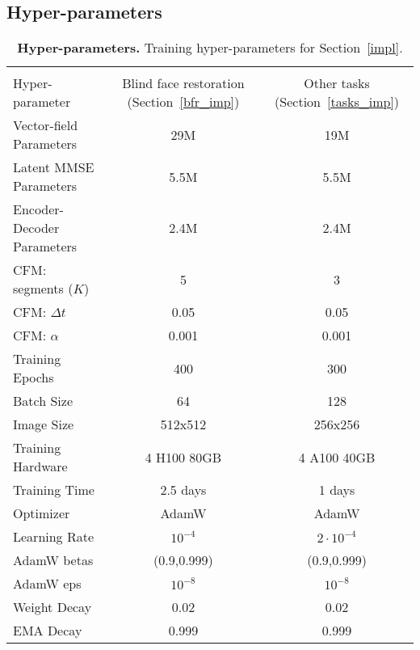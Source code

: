 \subsection{Hyper-parameters}\label{apx:hp}
\begin{table}[H]
\centering
\caption{\textbf{Hyper-parameters.} Training hyper-parameters
for Section~\ref{impl}.}
\begin{tabular}{lcc}
\toprule
 &  &  \\
\multirow{-2}{*}{Hyper-parameter} & \multirow{-2}{*}{Blind face restoration (Section~\ref{bfr_imp})} & \multirow{-2}{*}{Other tasks (Section~\ref{tasks_imp})} \\ 
\midrule\midrule
Vector-field Parameters & 29M & {\color[HTML]{333333} 19M} \\
Latent MMSE Parameters & 5.5M & 5.5M \\
Encoder-Decoder Parameters & 2.4M & 2.4M \\
\rowcolor[HTML]{FFFFFF} 
CFM: segments ($K$) & 5 & {\color[HTML]{333333} 3} \\
CFM: $\Delta t$ & 0.05 & 0.05 \\
CFM: $\alpha$ & 0.001 & 0.001 \\
\rowcolor[HTML]{FFFFFF} 
\cellcolor[HTML]{FFFFFF}Training Epochs & 400 & {\color[HTML]{333333} 300} \\
\rowcolor[HTML]{FFFFFF} 
\cellcolor[HTML]{FFFFFF}Batch Size & 64 & 128 \\
\rowcolor[HTML]{FFFFFF} 
\cellcolor[HTML]{FFFFFF}Image Size & 512x512 & 256x256 \\
\rowcolor[HTML]{FFFFFF} 
Training Hardware & \cellcolor[HTML]{FFFFFF}4 H100 80GB & 4 A100 40GB \\
\cellcolor[HTML]{FFFFFF}Training Time & 2.5 days & 1 days \\
Optimizer & AdamW & AdamW \\
Learning Rate & $10^{-4}$ & $2\cdot10^{-4}$ \\
AdamW betas & (0.9,0.999) & (0.9,0.999) \\
AdamW eps & $10^{-8}$ & $10^{-8}$ \\
Weight Decay & 0.02 & 0.02 \\
EMA Decay & \cellcolor[HTML]{FFFFFF}0.999 & \cellcolor[HTML]{FFFFFF}0.999
\\ \bottomrule
\end{tabular}
\label{hyperparams}
\end{table}






